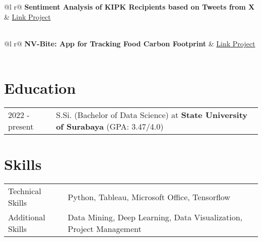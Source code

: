 \documentclass[a4paper,12pt]{article}
\begin{document}
\begin{tabularx}{\linewidth}{ @{}l r@{} }
\textbf{Sentiment Analysis of KIPK Recipients based on Tweets from X} & \hfill \href{https://github.com/rizky-22017-mhs-unesa-ac-id/Sentiment-Analysis-of-KIPK-Recipients-based-on-Tweets-from-X}{Link Project} \\[3.75pt]
 \\
\end{tabularx}

\begin{tabularx}{\linewidth}{ @{}l r@{} }
\textbf{NV-Bite: App for Tracking Food Carbon Footprint} & \hfill \href{https://github.com/NV-Bite}{Link Project} \\[3.75pt]
 \\
\end{tabularx}


\section{Education}
\begin{tabularx}{\linewidth}{@{}l X@{}}	
2022 - present & S.Si. (Bachelor of Data Science) at \textbf{State University of Surabaya} \hfill \normalsize (GPA: 3.47/4.0) \\
\end{tabularx}


\section{Skills}
\begin{tabularx}{\linewidth}{@{}l X@{}}
Technical Skills &  \normalsize{Python, Tableau, Microsoft Office, Tensorflow} \\
Additional Skills  &  \normalsize{Data Mining, Deep Learning, Data Visualization, Project Management} \\  
\end{tabularx}

\vfill
{}
\end{document}
